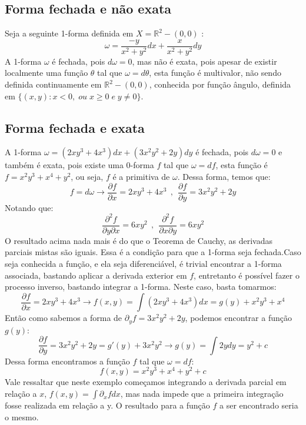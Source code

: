 \subsection{Forma fechada e não exata} 

Seja a seguinte 1-forma definida em $X=\mathbb{R}^2-(0,0)$ :
%
\[\omega = \frac{-y}{x^2+y^2}dx + \frac{x}{x^2+y^2}dy\] 
%
A 1-forma $\omega$ é fechada, pois $d\omega = 0$, mas não é exata, 
pois apesar de existir localmente uma função $\theta$ tal que 
$\omega = d\theta$, esta função é multivalor, não sendo definida 
continuamente em $\mathbb{R}^2-(0,0)$, conhecida por função ângulo, 
definida em $\{(x,y): x < 0, \; ou \; x \geq 0 \; e \; y \neq 0\}$.





\subsection{Forma fechada e exata} 
A 1-forma $\omega = (2xy^3+4x^3)dx + (3x^2y^2+2y)dy$ é fechada, 
pois $d\omega = 0$ e também é exata, pois existe uma 0-forma 
$f$ tal que $\omega = df$, esta função é $f = x^2y^3 + x^4 + y^2$, 
ou seja, $f$ é a primitiva de $\omega$. Dessa forma, temos que:
%
\[
f = d\omega \to \frac{\partial f}{\partial x} = 2xy^3+4x^3 
\ \ , \ \ 
\frac{\partial f}{\partial y} 
= 3x^2y^2+2y
\]
%
Notando que:
%
\[
\frac{\partial^2f}{\partial y \partial x} 
= 6xy^2 
\ \ , \ \ 
\frac{\partial^2 f}{\partial x \partial y} 
= 6xy^2
\]
%
O resultado acima nada mais é do que o Teorema de Cauchy, 
as derivadas parciais mistas são iguais. Essa é a condição 
para que a 1-forma seja fechada.Caso seja conhecida a função, 
e ela seja diferenciável, é trivial encontrar a 1-forma associada, 
bastando aplicar a derivada exterior em $f$, entretanto é possível 
fazer o processo inverso, bastando integrar a 1-forma. Neste caso, 
basta tomarmos:
%
\[
\frac{\partial f}{\partial x} = 2xy^3+4x^3 
\to f(x,y) = 
\int (2xy^3+4x^3) dx = g(y) + x^2y^3 + x^4 
\]
%
Então como sabemos a forma de $\partial_y f = 3x^2y^2+2y$, 
podemos encontrar a função $g(y)$:
%
\[
\frac{\partial f}{\partial y}
= 3x^2y^2+2y = g'(y) + 3x^2y^2 
\to g(y) = \int 2y dy = y^2 + c
\]
%
Dessa forma encontramos a função $f$ tal que 
$\omega = df$:
%
\[
f(x,y) = x^2y^3 + x^4 + y^2 + c
\]
%
Vale ressaltar que neste exemplo começamos integrando a 
derivada parcial em relação a $x$, $f(x,y) = \int \partial_x f dx$, 
mas nada impede que a primeira integração fosse realizada em relação 
a y. O resultado para a função $f$ a ser encontrado seria o mesmo.





